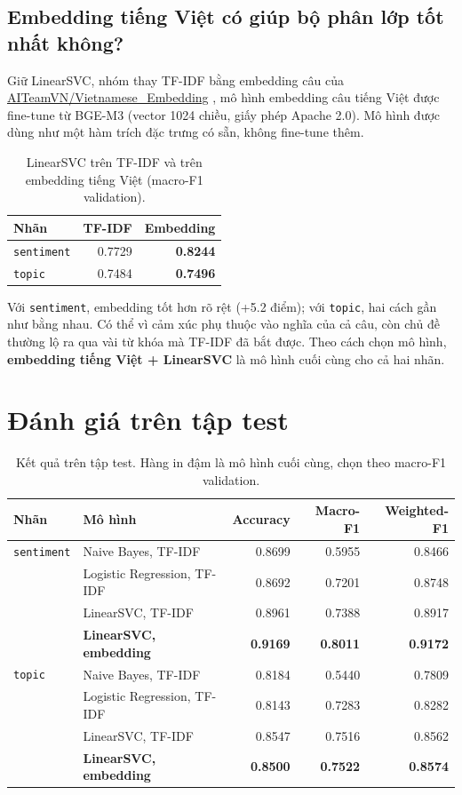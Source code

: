 \subsection{Embedding tiếng Việt có giúp bộ phân lớp tốt nhất không?}

Giữ LinearSVC, nhóm thay TF-IDF bằng embedding câu của \url{AITeamVN/Vietnamese_Embedding} \cite{text-emb}, mô hình embedding câu
tiếng Việt được fine-tune từ BGE-M3 (vector 1024 chiều, giấy phép Apache 2.0). Mô hình được dùng như một hàm trích đặc
trưng có sẵn, không fine-tune thêm.

\begin{table}[H]\centering
\caption{LinearSVC trên TF-IDF và trên embedding tiếng Việt (macro-F1 validation).}\label{tab:text-emb-val}
\begin{tabular}{lrr}
\toprule
Nhãn & TF-IDF & Embedding \\
\midrule
\texttt{sentiment} & 0.7729 & \textbf{0.8244} \\
\texttt{topic} & 0.7484 & \textbf{0.7496} \\
\bottomrule
\end{tabular}
\end{table}

Với \texttt{sentiment}, embedding tốt hơn rõ rệt (+5.2 điểm); với \texttt{topic}, hai cách gần như bằng nhau. Có thể vì
cảm xúc phụ thuộc vào nghĩa của cả câu, còn chủ đề thường lộ ra qua vài từ khóa mà TF-IDF đã bắt được. Theo cách chọn
mô hình, \textbf{embedding tiếng Việt + LinearSVC} là mô hình cuối cùng cho cả hai nhãn.

\section{Đánh giá trên tập test}

\begin{table}[H]\centering
\caption{Kết quả trên tập test. Hàng in đậm là mô hình cuối cùng, chọn theo macro-F1 validation.}\label{tab:text-test}
\begin{tabular}{llrrr}
\toprule
Nhãn & Mô hình & Accuracy & Macro-F1 & Weighted-F1 \\
\midrule
\texttt{sentiment} & Naive Bayes, TF-IDF & 0.8699 & 0.5955 & 0.8466 \\
 & Logistic Regression, TF-IDF & 0.8692 & 0.7201 & 0.8748 \\
 & LinearSVC, TF-IDF & 0.8961 & 0.7388 & 0.8917 \\
 & \textbf{LinearSVC, embedding} & \textbf{0.9169} & \textbf{0.8011} & \textbf{0.9172} \\
\midrule
\texttt{topic} & Naive Bayes, TF-IDF & 0.8184 & 0.5440 & 0.7809 \\
 & Logistic Regression, TF-IDF & 0.8143 & 0.7283 & 0.8282 \\
 & LinearSVC, TF-IDF & 0.8547 & 0.7516 & 0.8562 \\
 & \textbf{LinearSVC, embedding} & \textbf{0.8500} & \textbf{0.7522} & \textbf{0.8574} \\
\bottomrule
\end{tabular}
\end{table}


